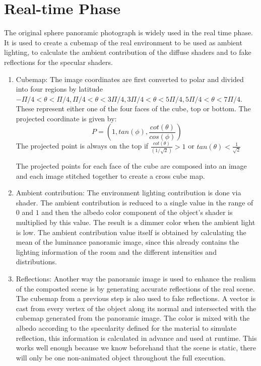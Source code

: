 \section{Real-time Phase}
The original sphere panoramic photograph is widely used in the real time phase. It is used to create a cubemap of the real environment to be used as ambient lighting, to calculate the ambient contribution of the diffuse shaders and to fake reflections for the specular shaders.
\begin{enumerate}

\item Cubemap: The image coordinates are first converted to polar and divided into four regions by latitude $-\Pi/4 < \theta < \Pi/4 , \Pi/4 < \theta < 3\Pi/4, 3\Pi/4 < \theta < 5\Pi/4, 5\Pi/4 < \theta < 7\Pi/4$. These represent either one of the four faces of the cube, top or bottom. The projected coordinate is given by:
\begin{equation}
P = (1, tan(\phi), \frac{cot(\theta)}{cos(\phi)})
\end{equation}
 The projected point is always on the top if $ \frac{cot(\theta)} { (1/\sqrt{2}) }> 1$ or $tan(\theta)< \frac{1}{\sqrt{2}}$ \newline
 
 The projected points for each face of the cube are composed into an image and each image stitched together to create a cross cube map.
 
 \item Ambient contribution: The environment lighting contribution is done via shader. The ambient contribution is reduced to a single value in the range of $0$ and $1$ and then the albedo color component of the object's shader is multiplied by this value. The result is a dimmer color when the ambient light is low. 
 The ambient contribution value itself is obtained by calculating the mean of the luminance panoramic image, since this already contains the lighting information of the room and the different intensities and distributions.
 
 \item Reflections: Another way the panoramic image is used to enhance the realism of the composted scene is by generating accurate reflections of the real scene. The cubemap from a previous step is also used to fake reflections. A vector is cast from every vertex of the object along its normal and intersected with the cubemap generated from the panoramic image. The color is mixed with the albedo according to the specularity defined for the material to simulate reflection, this information is calculated in advance and used at runtime. This works well enough because we know beforehand that the scene is static, there will only be one non-animated object throughout the full execution.
 

\end{enumerate}
